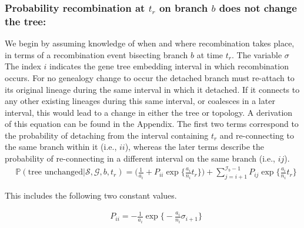 \documentclass[11pt]{article}
\begin{document}
\subsubsection{Probability recombination at $t_r$ on branch $b$ does not change the tree:}
We begin by assuming knowledge of when and where recombination takes place, in terms 
of a recombination event bisecting branch $b$ at time $t_r$. The variable $\sigma$ 
The index $i$ indicates the gene tree embedding interval in which recombination occurs.
For no genealogy change to occur the detached branch must re-attach to its original 
lineage during the same interval in which it detached.
If it connects to any other existing lineages during this same interval, 
or coalesces in a later interval, this would lead to a change in either the 
tree or topology. A derivation of this equation can be found in the Appendix.
The first two terms correspond to the probability of detaching from the interval containing $t_r$ and 
re-connecting to the same branch within it (i.e., $ii$), whereas the 
later terms describe the probability of re-connecting in a different interval on the same branch (i.e., $ij$).
\begin{equation}
\begin{aligned}
	&\mathbb{P}(\text{tree unchanged} | \mathcal{S},\mathcal{G},b,t_r) = 
	\bigg(\frac{1}{a_i} +P_{ii} \exp \bigg\{\frac{a_i}{n_i}t_r\bigg\}\bigg) + 
	\sum_{j=i+1}^{\mathcal{I}_b - 1} P_{ij} \exp\bigg\{\frac{a_i}{n_i}t_r\bigg\} 
\end{aligned}
\end{equation}

\noindent This includes the following two constant values.

\begin{equation}
\begin{aligned}
	&P_{ii} = - \frac{1}{a_i} \exp \bigg\{-\frac{a_i}{n_i}\sigma_{i + 1} \bigg\} 	
\end{aligned}
\end{equation}
\end{document}
